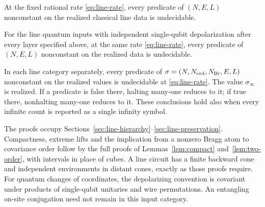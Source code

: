 \begin{theorem}\label{thm:line-classical}
At the fixed rational rate \eqref{eq:line-rate}, every predicate of
$(N,E,L)$ nonconstant on the realized classical line data is undecidable.
\end{theorem}

\begin{theorem}\label{thm:line-quantum}
For the line quantum inputs with independent single-qubit depolarization
after every layer specified above, at the same rate
\eqref{eq:line-rate}, every predicate of $(N,E,L)$ nonconstant on the
realized data is undecidable.
\end{theorem}

\begin{theorem}\label{thm:line-refined}
In each line category separately, every predicate of
$\sigma=(N,N_{\mathrm{ord}},N_{\mathrm{Br}},E,L)$ nonconstant on the realized values is
undecidable at \eqref{eq:line-rate}. The value $\sigma_\infty$ is realized.
If a predicate is false there, halting many-one reduces to it; if true
there, nonhalting many-one reduces to it. These conclusions hold also
when every infinite count is reported as a single infinity symbol.
\end{theorem}

The proofs occupy Sections~\ref{sec:line-hierarchy}--\ref{sec:line-preservation}.
Compactness, extreme lifts and the implication from a nonzero Bragg
atom to covariance order follow by the full proofs of
Lemmas~\ref{lem:compact} and~\ref{lem:two-order}, with intervals in place
of cubes. A line circuit has a finite backward cone and independent
environments in distant cones, exactly as those proofs require.
For quantum changes of coordinates, the depolarizing convention is
covariant under products of single-qubit unitaries and wire permutations.
An entangling on-site conjugation need not remain in this input category.
